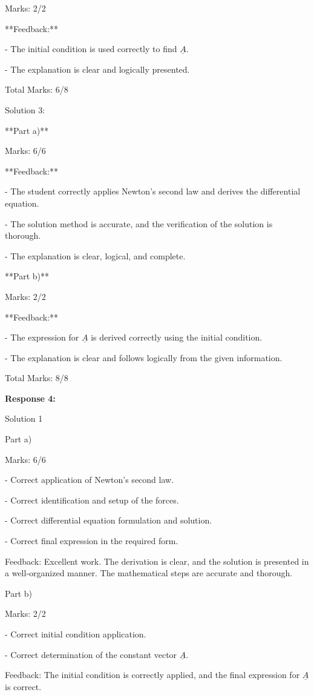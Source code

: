 \documentclass[a4paper,11pt]{article}
\begin{document}
Marks: 2/2

**Feedback:**

- The initial condition is used correctly to find \( \underline{A} \).

- The explanation is clear and logically presented.

Total Marks: 6/8

Solution 3:

**Part a)** 

Marks: 6/6

**Feedback:**

- The student correctly applies Newton's second law and derives the differential equation.

- The solution method is accurate, and the verification of the solution is thorough.

- The explanation is clear, logical, and complete.

**Part b)** 

Marks: 2/2

**Feedback:**

- The expression for \( \underline{A} \) is derived correctly using the initial condition.

- The explanation is clear and follows logically from the given information.

Total Marks: 8/8

\bigskip
\textbf{Response 4:}

Solution 1

Part a)

Marks: 6/6

- Correct application of Newton's second law.

- Correct identification and setup of the forces.

- Correct differential equation formulation and solution.

- Correct final expression in the required form.

Feedback: Excellent work. The derivation is clear, and the solution is presented in a well-organized manner. The mathematical steps are accurate and thorough.

Part b)

Marks: 2/2

- Correct initial condition application.

- Correct determination of the constant vector \( \underline{A} \).

Feedback: The initial condition is correctly applied, and the final expression for \( \underline{A} \) is correct.
\end{document}
